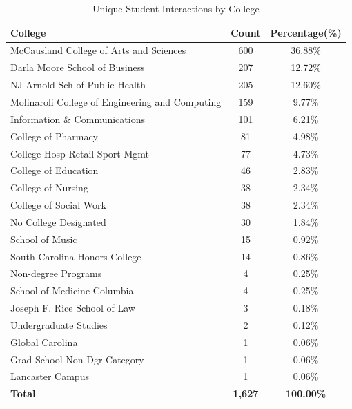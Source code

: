 \documentclass[
  letterpaper,
  DIV=11,
  numbers=noendperiod]{scrartcl}
\begin{document}
\begin{longtable}[t]{lcc}
\caption{\label{tab:CollegeTabLSC}Unique Student Interactions by College}\\
\toprule
\textbf{College} & \textbf{Count} & \textbf{Percentage(\%)}\\
\midrule
McCausland College of Arts and Sciences & 600 & 36.88\%\\
Darla Moore School of Business & 207 & 12.72\%\\
NJ Arnold Sch of Public Health & 205 & 12.60\%\\
Molinaroli College of Engineering and Computing & 159 & 9.77\%\\
Information \& Communications & 101 & 6.21\%\\
\addlinespace
College of Pharmacy & 81 & 4.98\%\\
College Hosp Retail Sport Mgmt & 77 & 4.73\%\\
College of Education & 46 & 2.83\%\\
College of Nursing & 38 & 2.34\%\\
College of Social Work & 38 & 2.34\%\\
\addlinespace
No College Designated & 30 & 1.84\%\\
School of Music & 15 & 0.92\%\\
South Carolina Honors College & 14 & 0.86\%\\
Non-degree Programs & 4 & 0.25\%\\
School of Medicine Columbia & 4 & 0.25\%\\
\addlinespace
Joseph F. Rice School of Law & 3 & 0.18\%\\
Undergraduate Studies & 2 & 0.12\%\\
Global Carolina & 1 & 0.06\%\\
Grad School Non-Dgr Category & 1 & 0.06\%\\
Lancaster Campus & 1 & 0.06\%\\
\midrule
\addlinespace
\textbf{Total} & \textbf{1,627} & \textbf{100.00\%}\\
\bottomrule
\end{longtable}
\endgroup{}
\end{document}
